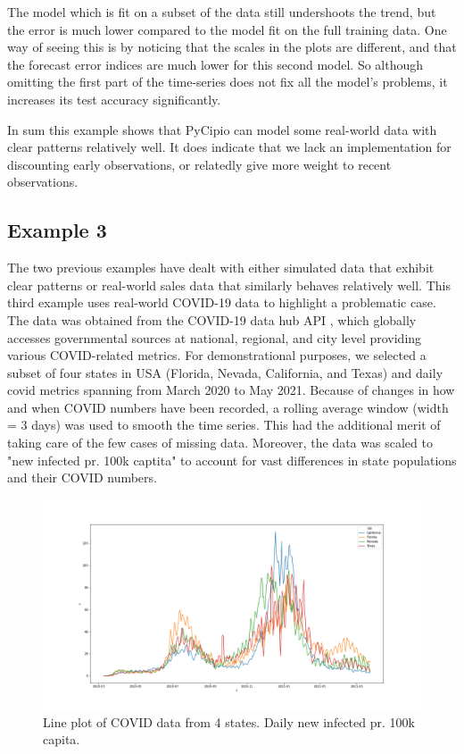 \documentclass{article}
\begin{document}
The model which is fit on a subset of the data still undershoots the trend, but the error is much lower compared to the model fit on the full training data. One way of seeing this is by noticing that the scales in the plots are different, and that the forecast error indices are much lower for this second model. So although omitting the first part of the time-series does not fix all the model's problems, it increases its test accuracy significantly. 

In sum this example shows that PyCipio can model some real-world data with clear patterns relatively well. It does indicate that we lack an implementation for discounting early observations, or relatedly give more weight to recent observations. 

\subsection{Example 3}

The two previous examples have dealt with either simulated data that exhibit clear patterns or real-world sales data that similarly behaves relatively well. This third example uses real-world COVID-19 data to highlight a problematic case. The data was obtained from the COVID-19 data hub API \cite{COVID-19-data-hub}, which globally accesses governmental sources at national, regional, and city level providing various COVID-related metrics. For demonstrational purposes, we selected a subset of four states in USA (Florida, Nevada, California, and Texas) and daily covid metrics spanning from March 2020 to May 2021. Because of changes in how and when COVID numbers have been recorded, a rolling average window (width = 3 days) was used to smooth the time series. This had the additional merit of taking care of the few cases of missing data. Moreover, the data was scaled to "new infected pr. 100k captita" to account for vast differences in state populations and their COVID numbers.  

\begin{figure}[H]
    \centerline{\includegraphics[scale = 0.45]{../plots/ex3_raw_data.png}}
    \caption{Line plot of COVID data from 4 states. Daily new infected pr. 100k capita.}
\end{figure}
\end{document}
